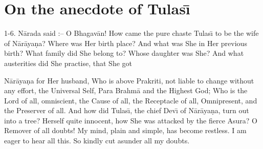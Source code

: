 \chapter{On the anecdote of Tulas\={\i}}

1-6. N\=arada said :-- O Bhagav\=an! How came the pure chaste Tulas\={\i} to be the wife of N\=ar\=aya\d{n}a? Where was Her birth place? And what was She in Her previous birth? What family did She belong to? Whose daughter was She? And what austerities did She practise, that She got

N\=ar\=aya\d{n}a for Her husband, Who is above Prakriti, not liable to change without any effort, the Universal Self, Para Brahm\=a and the Highest God; Who is the Lord of all, omniscient, the Cause of all, the Receptacle of all, Omnipresent, and the Preserver of all. And how did Tulas\={\i}, the chief Dev\={\i} of N\=ar\=aya\d{n}a, turn out into a tree? Herself quite innocent, how She was attacked by the fierce Asura? O Remover of all doubts! My mind, plain and simple, has become restless. I am eager to hear all this. So kindly cut asunder all my doubts.

